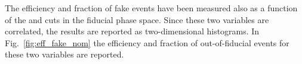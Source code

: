 The efficiency and fraction of fake events have been measured also as a function of the \MET and \mt cuts in the fiducial phase space. Since these two variables are correlated, the results are reported as two-dimensional histograms. In Fig.~\ref{fig:eff_fake_nom} the efficiency and fraction of out-of-fiducial events for these two variables are reported.

